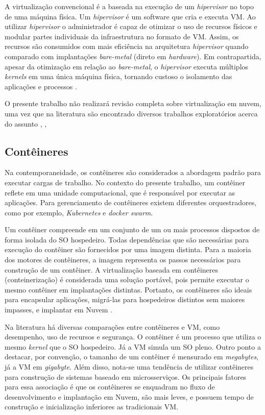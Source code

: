 \documentclass[
	12pt,				%
	openright,			%
	oneside,			%
	a4paper,			%
	brazil				%
	]{abntex2}
\providecommand{\DIFdelbegin}{} %
\providecommand{\DIFdelend}{} %
\newcommand{\DIFscaledelfig}{0.5}
\newlength{\DIFdelgraphicswidth} %
\newlength{\DIFdelgraphicsheight} %
\newcommand{\DIFdelincludegraphics}[2][]{%
\sbox{\DIFdelgraphicsbox}{\DIFOincludegraphics[#1]{#2}}%
\settoboxwidth{\DIFdelgraphicswidth}{\DIFdelgraphicsbox} %
\settoboxtotalheight{\DIFdelgraphicsheight}{\DIFdelgraphicsbox} %
\scalebox{\DIFscaledelfig}{%
\parbox[b]{\DIFdelgraphicswidth}{\usebox{\DIFdelgraphicsbox}\\[-\baselineskip] \rule{\DIFdelgraphicswidth}{0em}}\llap{\resizebox{\DIFdelgraphicswidth}{\DIFdelgraphicsheight}{%
\setlength{\unitlength}{\DIFdelgraphicswidth}%
\begin{picture}(1,1)%
\thicklines\linethickness{2pt} %
{\color[rgb]{1,0,0}\put(0,0){\framebox(1,1){}}}%
{\color[rgb]{1,0,0}\put(0,0){\line( 1,1){1}}}%
{\color[rgb]{1,0,0}\put(0,1){\line(1,-1){1}}}%
\end{picture}%
}\hspace*{3pt}}} %
} %
\DeclareRobustCommand{\DIFdelbegin}{\DIFOdelbegin \let\includegraphics\DIFdelincludegraphics} %
\DeclareRobustCommand{\DIFdelend}{\DIFOaddend \let\includegraphics\DIFOincludegraphics} %
\begin{document}
A virtualização convencional é a baseada na execução de um \textit{hipervisor} no topo de uma máquina física. Um \textit{hipervisor} é um software que cria e executa \ac{VM}. Ao utilizar \textit{hipervisor} o administrador é capaz de otimizar o uso de recursos físicos e modular partes individuais da infraestrutura no formato de \ac{VM}. Assim, os recursos são consumidos com mais eficiência na arquitetura \textit{hipervisor} quando comparado com implantações \textit{bare-metal} (direto em \textit{hardware}). Em contrapartida, apesar da otimização em relação ao \textit{bare-metal}, o \textit{hipervisor} executa múltiplos \textit{kernels} em uma única máquina física, tornando custoso o isolamento das aplicações e processos \cite{scheepers2014virtualization}.
\DIFdelbegin %

\DIFdelend %
O presente trabalho não realizará revisão completa sobre virtualização em nuvem, uma vez que na literatura são encontrado diversos trabalhos exploratórios acerca do assunto \cite{Assuno}, \cite{lu2014cloud}, \cite{aceto2013cloud}

\subsection{Contêineres}
Na contemporaneidade, os contêineres são considerados a abordagem padrão para executar cargas de trabalho. No contexto do presente trabalho, um contêiner reflete em uma unidade computacional, que é responsável por executar as aplicações. Para gerenciamento de contêineres existem diferentes orquestradores, como por exemplo, \textit{Kubernetes} e \textit{docker swarm}.
\DIFdelbegin %

\DIFdelend %
Um contêiner compreende em um conjunto de um ou mais processos dispostos de forma isolada do \ac{SO} hospedeiro. Todas dependências que são necessárias para execução do contêiner são fornecidos por uma imagem distinta. Para a maioria dos motores de contêineres, a imagem representa os passos necessários para construção de um contêiner. A virtualização baseada em contêineres (conteinerização) é considerada uma solução portável, pois permite executar o mesmo contêiner em implantações distintas. Portanto, os contêineres são ideais para encapsular aplicações, migrá-las para hospedeiros distintos sem maiores impasses, e implantar em Nuvem .

Na literatura há diversas comparações entre contêineres e \ac{VM}, como desempenho, uso de recursos e segurança. O contêiner é um processo que utiliza o mesmo \textit{kernel} que o \ac{SO} hospedeiro. Já a \ac{VM} simula um \ac{SO} pleno. Outro ponto a destacar, por convenção, o tamanho de um contêiner é mensurado em \textit{megabytes}, já a \ac{VM} em \textit{gigabyte}. Além disso, nota-se uma tendência de utilizar contêineres para construção de sistemas baseado em microsserviços. Os principais fatores para essa associação é que os contêineres se enquadram no fluxo de desenvolvimento e implantação em Nuvem, são mais leves, e possuem tempo de construção e inicialização inferiores as tradicionais \ac{VM}.
\end{document}
